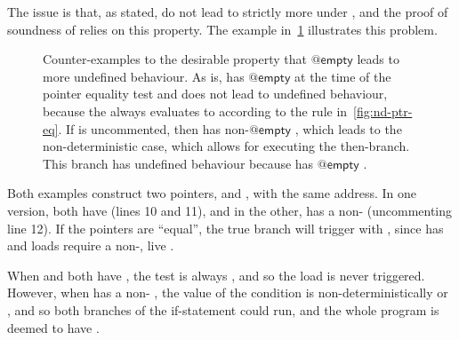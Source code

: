 The issue is that, as stated,   do not lead to
strictly more  under , and the proof of soundness of
 relies on this property. The example
in~\cref{fig:non-det-ptr-eq-problem} illustrates this problem.

\begin{figure}
    \caption{Counter-examples to the desirable property that
    $@\mathsf{empty}$  leads to more undefined behaviour.  As is,
     has $@\mathsf{empty}$  at the time of the pointer
    equality test and does not lead to undefined behaviour, because the
     always evaluates to  according to the rule
    in~\cref{fig:nd-ptr-eq}. If  is uncommented, then
     has non-$@\mathsf{empty}$ , which leads to the
    non-deterministic case, which allows for executing the then-branch. This
    branch has undefined behaviour because  has $@\mathsf{empty}$
    .}\label{fig:non-det-ptr-eq-problem}
\end{figure}

Both examples construct two pointers,  and , with the
same address. In one version, both have  
(lines 10 and 11), and in the other,  has a non-
 (uncommenting line 12). If the pointers are ``equal'', the true
branch will
trigger  with , since  has 
 and loads require a non-, live \@.

When  and  both have  ,
the test is always , and so the  load is never triggered. However, when
 has a non- , the value of the
condition is non-deterministically  or , and so
both branches of the if-statement could run, and the whole program is deemed to
have .

